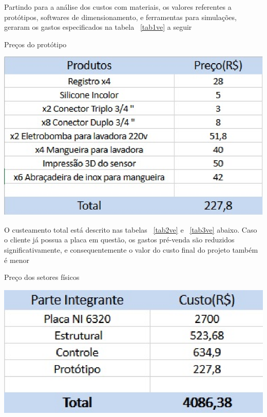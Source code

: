 Partindo para a análise dos custos com materiais, os valores referentes a protótipos, softwares de dimensionamento, e ferramentas para simulações, geraram os gastos especificados na tabela ~\ref{tab1ve} a seguir 
\begin{table}[!htb]
	\centering
	\caption{Preços do protótipo}\label{tab1ve}
	\includegraphics[scale=1]{figuras/figura1ve.eps}
\end{table} 
\newpage
O custeamento total está descrito nas tabelas ~\ref{tab2ve} e ~\ref{tab3ve} abaixo. Caso o cliente já possua a placa em questão, os gastos pré-venda são reduzidos significativamente, e consequentemente o valor do custo final do projeto também é menor\\ 
\begin{table}[!htb]
	\centering
	\caption{Preço dos setores físicos}\label{tab2ve}
	\includegraphics[scale=1]{figuras/figura2ve.eps}
\end{table}
